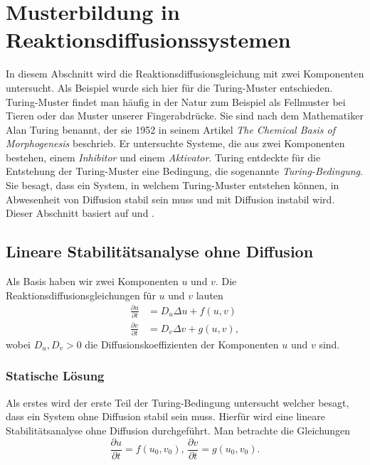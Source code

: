 %
%
%
%
\section{Musterbildung in Reaktionsdiffusionssystemen
\label{reaktdiff:section:teil1}}

In diesem Abschnitt wird die Reaktionsdiffusionsgleichung mit zwei Komponenten untersucht.
Als Beispiel wurde sich hier für die Turing-Muster entschieden.
%
Turing-Muster findet man häufig in der Natur zum Beispiel als Fellmuster bei Tieren oder  das Muster unserer Fingerabdrücke.
%
%
Sie sind nach dem Mathematiker Alan Turing benannt, der sie 1952 in seinem Artikel \textit{The Chemical Basis of Morphogenesis} \cite{turing1952chemical} beschrieb.
%
Er untersuchte Systeme, die aus zwei Komponenten bestehen, einem \emph{Inhibitor} und einem \emph{Aktivator}.
%
%
Turing entdeckte für die Entstehung der Turing-Muster eine Bedingung, die sogenannte \emph{Turing-Bedingung}.
%
Sie besagt, dass ein System, in welchem Turing-Muster entstehen können, in Abwesenheit von Diffusion stabil sein muss und mit Diffusion instabil wird.
Dieser Abschnitt basiert auf \cite{reaktdiff:turing_patterns_2019} und \cite{reaktdiff:hoyle2006pattern}.

\subsection{Lineare Stabilitätsanalyse ohne Diffusion
\label{reaktdiff:subsection:mathe}}
Als Basis haben wir zwei Komponenten \(u\) und \(v\).
Die Reaktionsdiffusionsgleichungen für \(u\) und \(v\) lauten
\begin{align*}
    \frac{\partial u}{\partial t} &= D_u \Delta u + f(u,v)\\
    \label{reaktdiff:equation:reaktdiff2}
    \frac{\partial v}{\partial t} &= D_v \Delta v + g(u,v),
\end{align*}
wobei \(D_u, D_v > 0\) die Diffusionskoeffizienten der Komponenten \(u\) und \(v\) sind.

\subsubsection{Statische Lösung}
Als erstes wird der erste Teil der Turing-Bedingung untersucht welcher besagt, dass ein System ohne Diffusion stabil sein muss.
Hierfür wird eine lineare Stabilitätsanalyse ohne Diffusion durchgeführt.
Man betrachte die Gleichungen
\begin{equation}
    \label{reaktdiff:equation:reaktdiff2ohneDiff}
    \frac{\partial u}{\partial t} = f(u_0,v_0),\,
    \frac{\partial v}{\partial t} = g(u_0,v_0).
\end{equation}

